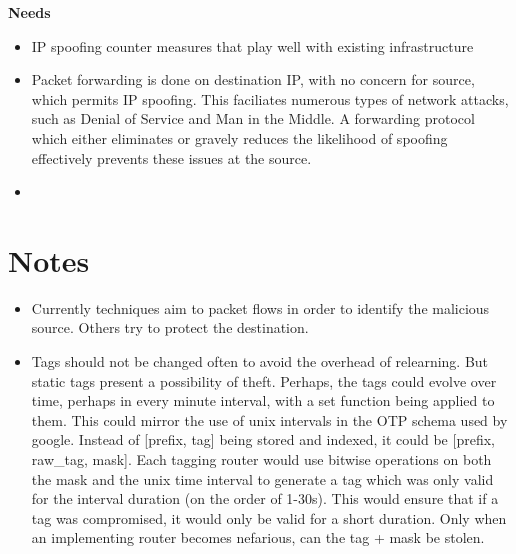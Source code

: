 \documentclass[12pt]{article}
\begin{document}
	\bf{Needs}
	\begin{itemize}
		\item IP spoofing counter measures that play well with existing infrastructure
		\item Packet forwarding is done on destination IP, with no concern for source, which permits IP spoofing. 
			This faciliates numerous types of network attacks, such as Denial of Service and Man in the Middle. 
			A forwarding protocol which either eliminates or gravely reduces the likelihood of spoofing effectively 
			prevents these issues at the source.
		\item 
	\end{itemize}
	




	\section{Notes}
		\begin{itemize}
			\item Currently techniques aim to  packet flows in order to identify the malicious source. Others try to protect the destination.
			\item Tags should not be changed often to avoid the overhead of relearning. But static tags present a possibility of theft. Perhaps, the tags could evolve over time, perhaps in every minute interval, with a set function being applied to them. This could mirror the use of unix intervals in the OTP schema used by google. Instead of {[}prefix, tag{]} being stored and indexed, it could be {[}prefix, raw_tag, mask{]}. Each tagging router would use bitwise operations on both the mask and the unix time interval to generate a tag which was only valid for the interval duration (on the order of 1-30s). This would ensure that if a tag was compromised, it would only be valid for a short duration. Only when an implementing router becomes nefarious, can the tag + mask be stolen.
		\end{itemize}
\end{document}
